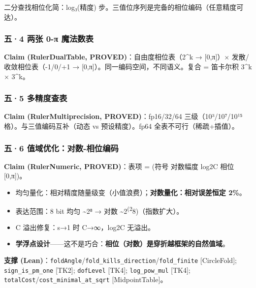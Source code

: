 \documentclass[
]{article}
\providecommand{\tightlist}{%
  \setlength{\itemsep}{0pt}\setlength{\parskip}{0pt}}
\begin{document}
二分查找相位化简：log₃(精度)
步。三值位序列是完备的相位编码（任意精度可达）。

\subsubsection{五·4 两张 0-π
魔法数表}\label{ux4e944-ux4e24ux5f20-0-ux3c0-ux9b54ux6cd5ux6570ux8868}

\textbf{Claim (RulerDualTable, PROVED)}：自由度相位表（2\^{}k →
{[}0,π{]}）× 发散/收敛相位表（-1/0/+1 →
{[}0,π{]}）。同一编码空间，不同语义。复合 = 笛卡尔积 3\^{}k × 3\^{}k。

\subsubsection{五·5
多精度查表}\label{ux4e945-ux591aux7cbeux5ea6ux67e5ux8868}

\textbf{Claim (RulerMultiprecision, PROVED)}：fp16/32/64
三级（10³/10⁷/10¹⁵ 格）。与三值编码互补（动态 vs 预设精度）。fp64
全表不可行（稀疏+插值）。

\subsubsection{五·6
值域优化：对数-相位编码}\label{ux4e946-ux503cux57dfux4f18ux5316ux5bf9ux6570-ux76f8ux4f4dux7f16ux7801}

\textbf{Claim (RulerNumeric, PROVED)}：表项 = (符号 \textbar{} 对数幅度
log2\textbar C\textbar{} \textbar{} 相位 {[}0,π{]})。

\begin{itemize}
\tightlist
\item
  均匀量化：相对精度随量级变（小值浪费）；\textbf{对数量化：相对误差恒定
  2\%}。
\item
  表达范围：8 bit 均匀 \textasciitilde2⁸ → 对数
  \textasciitilde2\textsuperscript{(2}8)（指数扩大）。
\item
  C 溢出修复：s→1 时 C→∞，log2\textbar C\textbar{} 无溢出。
\item
  \textbf{学浮点设计}------这不是巧合：\textbf{相位（对数）是穿折越框架的自然值域}。
\end{itemize}

\textbf{支撑
(Lean)}：\texttt{foldAngle}/\texttt{fold\_kills\_direction}/\texttt{fold\_finite}
{[}CircleFold{]}; \texttt{sign\_is\_pm\_one} {[}TK2{]};
\texttt{dofLevel} {[}TK4{]}; \texttt{log\_pow\_mul} {[}TK4{]};
\texttt{totalCost}/\texttt{cost\_minimal\_at\_sqrt}
{[}MidpointTable{]}。
\end{document}
